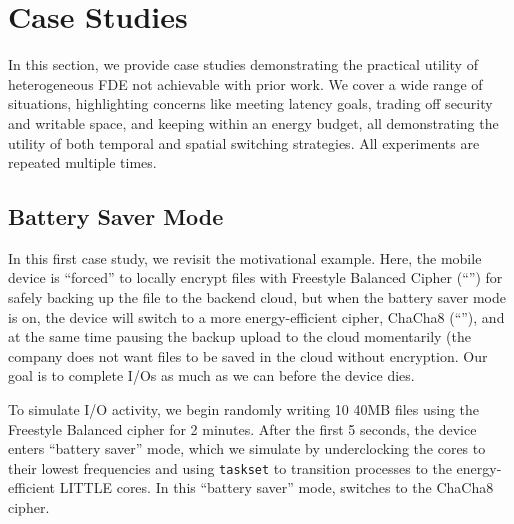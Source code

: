 \section{Case Studies}\label{sec:usecases}

In this section, we provide \numCases case studies demonstrating the practical
utility of heterogeneous FDE not achievable with prior work. We cover a wide
range of situations, highlighting concerns like meeting latency goals, trading
off security and writable space, and keeping within an energy budget, all
demonstrating the utility of both temporal and spatial switching strategies. All
experiments are repeated multiple times.


\subsection{Battery Saver Mode}\label{subsec:usecase-battery}

In this first case study, we revisit the motivational example. Here, the mobile
device is ``forced'' to locally encrypt files with Freestyle Balanced Cipher
(``\cone'') for safely backing up the file to the backend cloud, but when the
battery saver mode is on, the device will switch to a more energy-efficient
cipher, ChaCha8 (``\ctwo''), and at the same time pausing the backup upload to
the cloud momentarily (\eg the company does not want files to be saved in the
cloud without \cone encryption. Our goal is to complete I/Os as much as we can
before the device dies.

To simulate I/O activity, we begin randomly writing 10 40MB files using the
Freestyle Balanced cipher for 2 minutes. After the first 5 seconds, the device
enters ``battery saver'' mode, which we simulate by underclocking the cores to
their lowest frequencies and using \texttt{taskset} to transition \sys processes
to the energy-efficient LITTLE cores. In this ``battery saver'' mode, \sys
switches to the ChaCha8 cipher.



